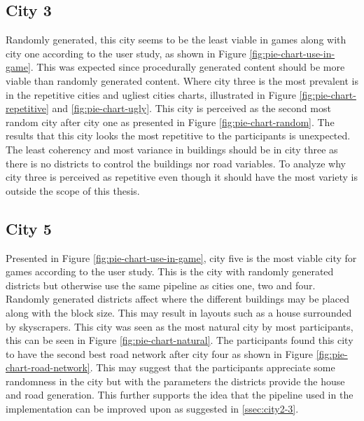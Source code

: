	\subsection{City 3}
		Randomly generated, this city seems to be the least viable in games along with city one according to the user study, as shown in Figure \ref{fig:pie-chart-use-in-game}. This was expected since procedurally generated content should be more viable than randomly generated content. Where city three is the most prevalent is in the repetitive cities and ugliest cities charts, illustrated in Figure \ref{fig:pie-chart-repetitive} and \ref{fig:pie-chart-ugly}. This city is perceived as the second most random city after city one as presented in Figure \ref{fig:pie-chart-random}. The results that this city looks the most repetitive to the participants is unexpected. The least coherency and most variance in buildings should be in city three as there is no districts to control the buildings nor road variables. To analyze why city three is perceived as repetitive even though it should have the most variety is outside the scope of this thesis.
	\subsection{City 5}
		Presented in Figure \ref{fig:pie-chart-use-in-game}, city five is the most viable city for games according to the user study. This is the city with randomly generated districts but otherwise use the same pipeline as cities one, two and four. Randomly generated districts affect where the different buildings may be placed along with the block size. This may result in layouts such as a house surrounded by skyscrapers. This city was seen as the most natural city by most participants, this can be seen in Figure \ref{fig:pie-chart-natural}. The participants found this city to have the second best road network after city four as shown in Figure \ref{fig:pie-chart-road-network}. This may suggest that the participants appreciate some randomness in the city but with the parameters the districts provide the house and road generation. This further supports the idea that the pipeline used in the implementation can be improved upon as suggested in \ref{ssec:city2-3}.
